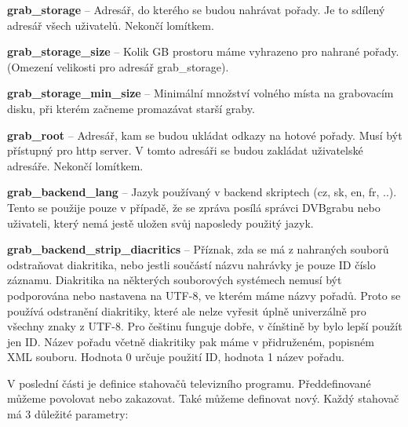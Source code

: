 \item\textbf{grab\_storage} -- Adresář, do kterého se budou nahrávat pořady. Je to sdílený adresář všech uživatelů. Nekončí lomítkem.
\item\textbf{grab\_storage\_size} -- Kolik GB prostoru máme vyhrazeno pro nahrané pořady. (Omezení velikosti pro adresář grab\_storage).
\item\textbf{grab\_storage\_min\_size} -- Minimální množství volného místa na grabovacím disku, při kterém začneme promazávat starší graby.
\item\textbf{grab\_root} -- Adresář, kam se budou ukládat odkazy na hotové pořady. Musí být přístupný pro http server. V tomto adresáři se budou zakládat uživatelské adresáře. Nekončí lomítkem.
\item\textbf{grab\_backend\_lang} -- Jazyk používaný v backend skriptech (cz, sk, en, fr, ..). Tento se použije pouze v případě, že se zpráva posílá správci DVBgrabu nebo uživateli, který nemá jestě uložen svůj naposledy použitý jazyk.
\item\textbf{grab\_backend\_strip\_diacritics} -- Příznak, zda se má z nahraných souborů odstraňovat diakritika, nebo jestli součástí názvu nahrávky je pouze ID číslo záznamu. Diakritika na některých souborových systémech nemusí být podporována nebo nastavena na UTF-8, ve kterém máme názvy pořadů. Proto se používá odstranění diakritiky, které ale nelze vyřesit úplně univerzálně pro všechny znaky z UTF-8. Pro češtinu funguje dobře, v čínštině by bylo lepší použít jen ID. Název pořadu včetně diakritiky pak máme v přidruženém, popisném XML souboru. Hodnota 0 určuje použití ID, hodnota 1 název pořadu.
\eitem

V poslední části je definice stahovačů televizního programu. Předdefinované můžeme povolovat nebo zakazovat. Také můžeme definovat nový. Každý stahovač má 3 důležité parametry:

